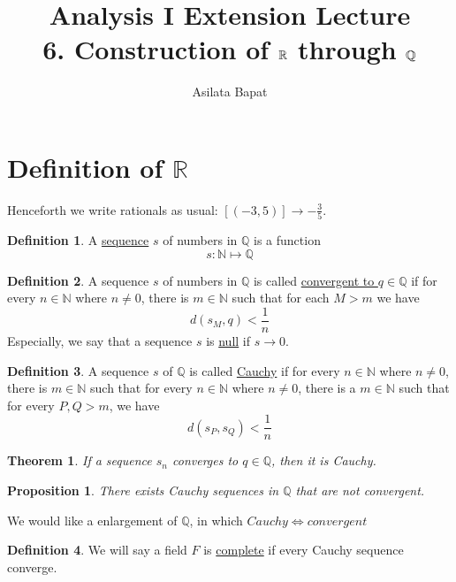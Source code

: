 \documentclass[12pt]{amsart}
\title[Construction of $\bbR$]{Analysis I Extension Lecture\\6. Construction of $\bbR$ through $\bbQ$}
\author{Asilata Bapat}
\newcommand{\bbR}{\mathbb{R}}
\newcommand{\bbN}{\mathbb{N}}
\newcommand{\bbQ}{\mathbb{Q}}
\theoremstyle{plain}
\newtheorem*{prop}{Proposition}
\newtheorem*{thm}{Theorem}
\theoremstyle{remark}
\theoremstyle{definition}
\newtheorem*{define}{Definition}
\begin{document}
\maketitle
{}
\section*{Definition of $\bbR$}
Henceforth we write rationals as usual: $[(-3,5)] \rightarrow -\displaystyle \frac{3}{5}$.
\begin{define}
	A \ul{sequence} $s$ of numbers in $\bbQ$ is a function
	\begin{equation*}
		s: \bbN  \mapsto \bbQ
	\end{equation*}
\end{define}

\begin{define}
	A sequence $s$ of numbers in $\bbQ$ is called \ul{convergent to $q\in \bbQ$} if for every $n \in \bbN$ where $n \neq 0$, there is $m\in \bbN$ such that for each $M > m$ we have 
	\begin{equation*}
		d(s_M, q) < \frac{1}{n}
	\end{equation*}
	Especially, we say that a sequence $s$ is \ul{null} if $s \rightarrow 0$.
\end{define}

\begin{define}
	A sequence $s$ of $\bbQ$ is called \ul{Cauchy} if for every $n \in \bbN$ where $n \neq 0$, there is $m \in \bbN$ such that for every $n \in \bbN$ where $n \neq 0$, there is a $m \in \bbN$ such that for every $P,Q > m$, we have 
	\begin{equation*}
		d(s_P, s_Q) < \frac{1}{n}
	\end{equation*}
\end{define}

\begin{thm}
	If a sequence $s_n$ converges to $q\in \bbQ$, then  it is Cauchy.
\end{thm}

\begin{prop}
	There exists Cauchy sequences in $\bbQ$ that are not convergent.
\end{prop}

\par
We would like a enlargement of $\bbQ$, in which $Cauchy \iff convergent$
\begin{define}
	We will say a field $F$ is \ul{complete} if every Cauchy sequence converge.
\end{define}
\end{document}
